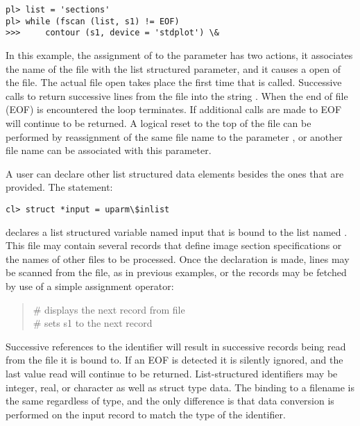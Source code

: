 \begin{verbatim}
pl> list = 'sections'
pl> while (fscan (list, s1) != EOF)
>>>     contour (s1, device = 'stdplot') \&
\end{verbatim}

In this example, the assignment of  to the 
parameter 
has two actions, it associates the name of the file 
with the list structured parameter, and it causes a 
open of the file.  The actual file open takes place the
first time that  is called.  Successive calls to 
 return successive lines from the file into the
string .  When the end of file (EOF) is encountered
the  loop terminates.  If additional calls are made to 
 EOF will continue to be returned.  A logical
reset to the top of the file can be performed by reassignment
of the same file name
to the parameter , or another file name can be
associated with this parameter.

A user can declare other list structured data elements besides the
ones that are provided.  The statement:

\begin{verbatim}
cl> struct *input = uparm\$inlist
\end{verbatim}

\noindent
declares a list structured variable named input that is bound
to the list named .  This file may
contain several records that define image section specifications
or the names of other files to be processed.  Once the declaration is
made, lines may be scanned from the file, as in previous examples, 
or the records may be fetched by use of a simple assignment operator:

\begin{quotation}\noindent
{}  \hfill \# displays the next record from
	file \\
  \hfill \# sets s1 to the next record  
\end{quotation}

\noindent
Successive references to the identifier  will result
in successive records being read from the file it is bound to.  If
an EOF is detected it is silently ignored, and the last value
read will continue to be returned.  List-structured identifiers may be
integer, real, or character as well as struct type data.
The binding to a filename is the same regardless of type,
and the only difference is that data conversion is
performed on the input record to match the type of the identifier.


